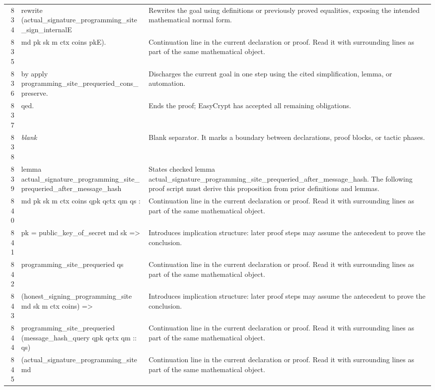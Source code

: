 \documentclass[10pt]{article}
\begin{document}
\begin{longtable}{r L{0.53\textwidth} L{0.37\textwidth}}
834 & {\ttfamily\scriptsize rewrite (actual\_signature\_programming\_site\_sign\_internalE} & Rewrites the goal using definitions or previously proved equalities, exposing the intended mathematical normal form. \\
835 & {\ttfamily\scriptsize            md pk sk m ctx coins pkE).} & Continuation line in the current declaration or proof.  Read it with surrounding lines as part of the same mathematical object. \\
836 & {\ttfamily\scriptsize by apply programming\_site\_prequeried\_cons\_preserve.} & Discharges the current goal in one step using the cited simplification, lemma, or automation. \\
837 & {\ttfamily\scriptsize qed.} & Ends the proof; EasyCrypt has accepted all remaining obligations. \\
838 & {\ttfamily\scriptsize \emph{blank}} & Blank separator.  It marks a boundary between declarations, proof blocks, or tactic phases. \\
839 & {\ttfamily\scriptsize lemma actual\_signature\_programming\_site\_prequeried\_after\_message\_hash} & States checked lemma actual\_signature\_programming\_site\_prequeried\_after\_message\_hash.  The following proof script must derive this proposition from prior definitions and lemmas. \\
840 & {\ttfamily\scriptsize   md pk sk m ctx coins qpk qctx qm qs :} & Continuation line in the current declaration or proof.  Read it with surrounding lines as part of the same mathematical object. \\
841 & {\ttfamily\scriptsize   pk = public\_key\_of\_secret md sk =>} & Introduces implication structure: later proof steps may assume the antecedent to prove the conclusion. \\
842 & {\ttfamily\scriptsize   programming\_site\_prequeried qs} & Continuation line in the current declaration or proof.  Read it with surrounding lines as part of the same mathematical object. \\
843 & {\ttfamily\scriptsize     (honest\_signing\_programming\_site md sk m ctx coins) =>} & Introduces implication structure: later proof steps may assume the antecedent to prove the conclusion. \\
844 & {\ttfamily\scriptsize   programming\_site\_prequeried (message\_hash\_query qpk qctx qm :: qs)} & Continuation line in the current declaration or proof.  Read it with surrounding lines as part of the same mathematical object. \\
845 & {\ttfamily\scriptsize     (actual\_signature\_programming\_site md} & Continuation line in the current declaration or proof.  Read it with surrounding lines as part of the same mathematical object. \\

\end{longtable}
\end{document}
